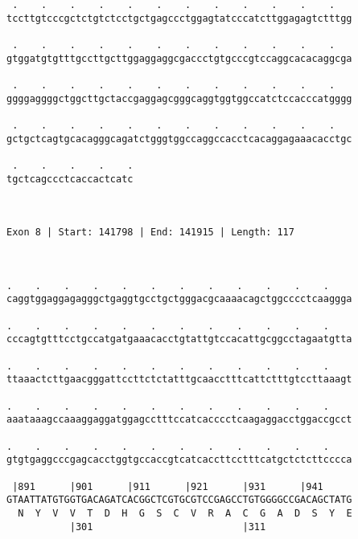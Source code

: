 \documentclass{article}
\begin{document}
\begin{Verbatim}
 .    .    .    .    .    .    .    .    .    .    .    .   
tccttgtcccgctctgtctcctgctgagccctggagtatcccatcttggagagtctttgg
                                                            
 .    .    .    .    .    .    .    .    .    .    .    .   
gtggatgtgtttgccttgcttggaggaggcgaccctgtgcccgtccaggcacacaggcga
                                                            
 .    .    .    .    .    .    .    .    .    .    .    .   
ggggaggggctggcttgctaccgaggagcgggcaggtggtggccatctccacccatgggg
                                                            
 .    .    .    .    .    .    .    .    .    .    .    .   
gctgctcagtgcacagggcagatctgggtggccaggccacctcacaggagaaacacctgc
                                                            
 .    .    .    .    .
tgctcagccctcaccactcatc
                      
                      
 
Exon 8 | Start: 141798 | End: 141915 | Length: 117



.    .    .    .    .    .    .    .    .    .    .    .    
caggtggaggagagggctgaggtgcctgctgggacgcaaaacagctggcccctcaaggga
                                                            
.    .    .    .    .    .    .    .    .    .    .    .    
cccagtgtttcctgccatgatgaaacacctgtattgtccacattgcggcctagaatgtta
                                                            
.    .    .    .    .    .    .    .    .    .    .    .    
ttaaactcttgaacgggattccttctctatttgcaacctttcattctttgtccttaaagt
                                                            
.    .    .    .    .    .    .    .    .    .    .    .    
aaataaagccaaaggaggatggagcctttccatcacccctcaagaggacctggaccgcct
                                                            
.    .    .    .    .    .    .    .    .    .    .    .    
gtgtgaggcccgagcacctggtgccaccgtcatcaccttcctttcatgctctcttcccca
                                                            
 |891      |901      |911      |921      |931      |941     
GTAATTATGTGGTGACAGATCACGGCTCGTGCGTCCGAGCCTGTGGGGCCGACAGCTATG
  N  Y  V  V  T  D  H  G  S  C  V  R  A  C  G  A  D  S  Y  E
           |301                          |311               
  

\end{Verbatim}
\end{document}
